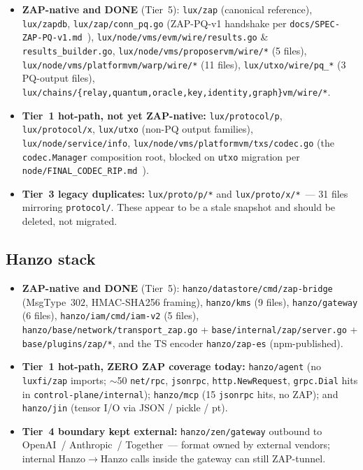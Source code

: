 \begin{itemize}[leftmargin=*]
  \item \textbf{ZAP-native and DONE} (Tier~5):
        \texttt{lux/zap} (canonical reference), \texttt{lux/zapdb},
        \texttt{lux/zap/conn\_pq.go} (ZAP-PQ-v1 handshake per
        \texttt{docs/SPEC-ZAP-PQ-v1.md}~\cite{zappqspec}),
        \texttt{lux/node/vms/evm/wire/results.go} \&
        \texttt{results\_builder.go},
        \texttt{lux/node/vms/proposervm/wire/*} (5 files),
        \texttt{lux/node/vms/platformvm/warp/wire/*} (11 files),
        \texttt{lux/utxo/wire/pq\_*} (3 PQ-output files),
        \texttt{lux/chains/\{relay,quantum,oracle,key,identity,graph\}vm/wire/*}.
  \item \textbf{Tier~1 hot-path, not yet ZAP-native:}
        \texttt{lux/protocol/p}, \texttt{lux/protocol/x},
        \texttt{lux/utxo} (non-PQ output families),
        \texttt{lux/node/service/info},
        \texttt{lux/node/vms/platformvm/txs/codec.go} (the
        \texttt{codec.Manager} composition root, blocked on
        \texttt{utxo} migration per
        \texttt{node/FINAL\_CODEC\_RIP.md}~\cite{finalcodecrip}).
  \item \textbf{Tier~3 legacy duplicates:} \texttt{lux/proto/p/*} and
        \texttt{lux/proto/x/*}~--- 31 files mirroring \texttt{protocol/}.
        These appear to be a stale snapshot and should be deleted, not
        migrated.
\end{itemize}

\subsection{Hanzo stack}

\begin{itemize}[leftmargin=*]
  \item \textbf{ZAP-native and DONE} (Tier~5):
        \texttt{hanzo/datastore/cmd/zap-bridge} (MsgType~$302$,
        HMAC-SHA256 framing),
        \texttt{hanzo/kms} (9 files), \texttt{hanzo/gateway} (6 files),
        \texttt{hanzo/iam/cmd/iam-v2} (5 files),
        \texttt{hanzo/base/network/transport\_zap.go} +
        \texttt{base/internal/zap/server.go} +
        \texttt{base/plugins/zap/*}, and the TS encoder
        \texttt{hanzo/zap-es} (npm-published).
  \item \textbf{Tier~1 hot-path, ZERO ZAP coverage today:}
        \texttt{hanzo/agent} (no \texttt{luxfi/zap} imports; $\sim$50
        \texttt{net/rpc}, \texttt{jsonrpc}, \texttt{http.NewRequest},
        \texttt{grpc.Dial} hits in \texttt{control-plane/internal});
        \texttt{hanzo/mcp} (15 \texttt{jsonrpc} hits, no ZAP); and
        \texttt{hanzo/jin} (tensor I/O via JSON / pickle / pt).
  \item \textbf{Tier~4 boundary kept external:}
        \texttt{hanzo/zen/gateway} outbound to OpenAI~/ Anthropic~/
        Together~--- format owned by external vendors; internal
        Hanzo$\to$Hanzo calls inside the gateway can still ZAP-tunnel.
\end{itemize}

